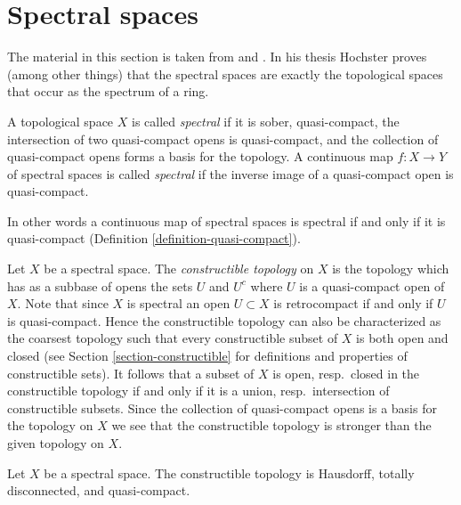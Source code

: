 \section{Spectral spaces}
\label{section-spectral}

\noindent
The material in this section is taken from \cite{Hochster} and
\cite{Hochster-thesis}. In his thesis Hochster proves (among
other things) that the spectral spaces are exactly the topological
spaces that occur as the spectrum of a ring.

\begin{definition}
\label{definition-spectral-space}
A topological space $X$ is called {\it spectral} if it is sober,
quasi-compact, the intersection of two quasi-compact opens is
quasi-compact, and the collection of quasi-compact opens forms a
basis for the topology. A continuous map $f : X \to Y$ of spectral
spaces is called {\it spectral} if the inverse image of a quasi-compact
open is quasi-compact.
\end{definition}

\noindent
In other words a continuous map of spectral spaces is spectral if and
only if it is quasi-compact (Definition \ref{definition-quasi-compact}).

\medskip\noindent
Let $X$ be a spectral space. The {\it constructible topology} on $X$
is the topology which has as a subbase of opens the sets $U$ and $U^c$
where $U$ is a quasi-compact open of $X$. Note that since $X$ is spectral
an open $U \subset X$ is retrocompact if and only if $U$ is quasi-compact.
Hence the constructible topology can also be characterized as the coarsest
topology such that every constructible subset of $X$ is both open and closed
(see Section \ref{section-constructible} for definitions and properties of
constructible sets).
It follows that a subset of $X$ is open, resp.\ closed in the constructible
topology if and only if it is a union, resp.\ intersection of constructible
subsets. Since the collection of quasi-compact opens is a basis for the topology
on $X$ we see that the constructible topology is stronger than the
given topology on $X$.

\begin{lemma}
\label{lemma-constructible-hausdorff-quasi-compact}
Let $X$ be a spectral space. The constructible topology is
Hausdorff, totally disconnected, and quasi-compact.
\end{lemma}

